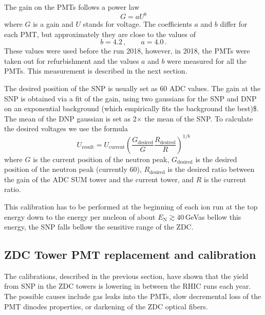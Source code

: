 The gain on the PMTs follows a power law
\begin{equation} \label{powerLaw}
G = aU^b
\end{equation}
where $G$ is a gain and $U$ stands for voltage. The coefficients $a$ and $b$ differ for each PMT, but approximately they are close to the values of~\cite{ZDCvoltsDependence}
\begin{equation}
b=4.2\,, \qquad a=4.0\,.
\end{equation}
These values were used before the run 2018, however, in 2018, the PMTs were taken out for refurbishment and the values $a$ and $b$ were measured for all the PMTs. This measurement is described in the next section.

The desired position of the SNP is usually set as 60 ADC values. The gain at the SNP is obtained via a fit of the gain, using two gaussians for the SNP and DNP on an exponential background (which empirically fits the background the best)\$. The mean of the DNP gaussian is set as 2$\times$ the mean of the SNP\@.
To calculate
the desired voltages we use the formula
\begin{equation}
U_{\text{result}} = U_\text{current}\left(\frac{G_\text{desired}}{G} 
\frac{R_\text{desired}}{R}\right)^{1/b}
\end{equation}
where $G$ is the current position of the neutron peak, $G_\text{desired}$ is the desired position
of the neutron peak (currently 60), $R_\text{desired}$ is the desired ratio between the gain of the ADC SUM
tower and the current tower, and $R$ is the current ratio.

This calibration has to be performed at the beginning of each ion run at the top energy down to the energy per nucleon of about $E_\mathrm{N}\gtrsim40\,$GeV\@ as bellow this energy, the SNP falls bellow the sensitive range of the ZDC\@.

\subsection{ZDC Tower PMT replacement and calibration}
The calibrations, described in the previous section, have shown that the yield from SNP in the ZDC towers is lowering in between the RHIC runs each year. The possible causes include gas leaks into the PMTs, slow decremental loss of the PMT dinodes properties, or darkening of the ZDC optical fibers. 

